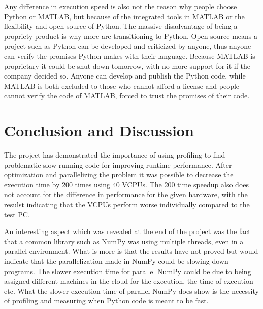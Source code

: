 \documentclass[12pt, a4paper]{article}
\begin{document}
Any difference in execution speed is also not the reason why people choose Python or MATLAB, but because of the integrated tools in MATLAB or the flexibility and open-source of Python.
The massive disadvantage of being a propriety product is why more are transitioning to Python.
Open-source means a project such as Python can be developed and criticized by anyone, thus anyone can verify the promises Python makes with their language.
Because MATLAB is proprietary it could be shut down tomorrow, with no more support for it if the company decided so.
Anyone can develop and publish the Python code, while MATLAB is both excluded to those who cannot afford a license and people cannot verify the code of MATLAB, forced to trust the promises of their code.



\section{Conclusion and Discussion}

The project has demonstrated the importance of using profiling to find problematic slow running code for improving runtime performance.
After optimization and parallelizing the problem it was possible to decrease the execution time by 200 times using 40 VCPUs. 
The 200 time speedup also does not account for the difference in performance for the given hardware, with the resulst indicating that the VCPUs perform worse individually compared to the test PC.

An interesting aspect which was revealed at the end of the project was the fact that a common library such as NumPy was using multiple threads, even in a parallel environment.
What is more is that the results have not proved but would indicate that the parallelization made in NumPy could be slowing down programs.
The slower execution time for parallel NumPy could be due to being assigned different machines in the cloud for the execution, the time of execution etc.
What the slower execution time of parallel NumPy does show is the necessity of profiling and measuring when Python code is meant to be fast.
\end{document}
